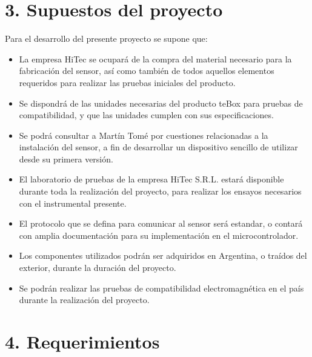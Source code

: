 \documentclass[11pt]{charter}
\begin{document}
\section{3. Supuestos del proyecto}
\label{sec:supuestos}

Para el desarrollo del presente proyecto se supone que:

\begin{itemize}
\item La empresa HiTec se ocupará de la compra del material necesario para la fabricación del sensor, así como también de todos aquellos elementos requeridos para realizar las pruebas iniciales del producto.
\item Se dispondrá de las unidades necesarias del producto teBox para pruebas de compatibilidad, y que las unidades cumplen con sus especificaciones.
\item Se podrá consultar a Martín Tomé por cuestiones relacionadas a la instalación del sensor, a fin de desarrollar un dispositivo sencillo de utilizar desde su primera versión.
\item El laboratorio de pruebas de la empresa HiTec S.R.L. estará disponible durante toda la realización del proyecto, para realizar los ensayos necesarios con el instrumental presente.
\item El protocolo que se defina para comunicar al sensor será estandar, o contará con amplia documentación para su implementación en el microcontrolador.
\item Los componentes utilizados podrán ser adquiridos en Argentina, o traídos del exterior, durante la duración del proyecto.
\item Se podrán realizar las pruebas de compatibilidad electromagnética en el país durante la realización del proyecto.
\end{itemize}


\section{4. Requerimientos}
\label{sec:requerimientos}
\end{document}
